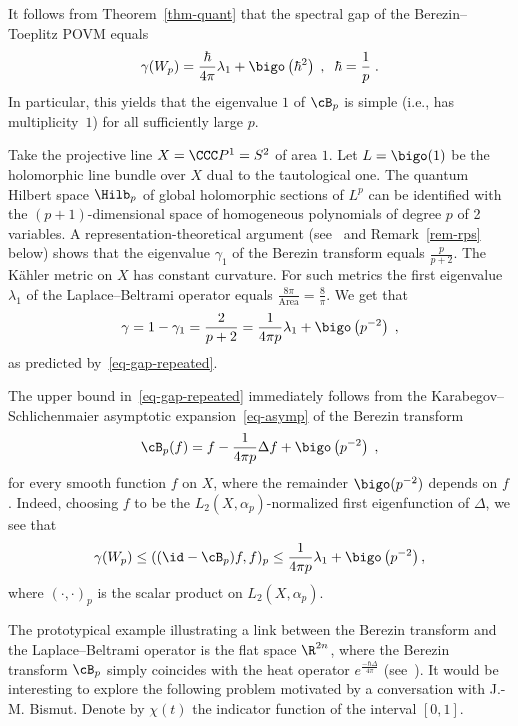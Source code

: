 It follows from Theorem~\ref{thm-quant} that the spectral gap of the Berezin--Toeplitz POVM equals
\begin{equation}\label{eq-gap-repeated}
\gamma(W_p)= \frac{\hbar}{4\pi}\lambda_1 + \bigo\left(\hbar^2\right)\;, \;\; \hbar = \frac{1}{p}\;.
\end{equation}
In particular, this yields that the eigenvalue $1$ of $\cB_p$ is simple (i.e., has multiplicity~$1$) for all sufficiently large $p$.

\begin{exam}\label{exam-CP1}
Take the projective line $X=\CCC P^1=S^2$ of area $1$.
Let $L= \bigo(1)$ be the holomorphic line bundle over $X$ dual to the tautological one. The quantum Hilbert space $\Hilb_p$ of global holomorphic sections of $L^p$ can be identified with the $(p+1)$-dimensional space of homogeneous polynomials of degree $p$ of 2 variables. A representation-theoretical argument (see~\cite {gap-representations, D} and Remark~\ref{rem-rps} below) shows that the eigenvalue $\gamma_1$ of the Berezin transform equals $\frac{p}{p+2}$. The K\"ahler metric on $X$ has constant curvature. For such metrics the first eigenvalue $\lambda_1$ of the Laplace--Beltrami operator equals $\frac{8\pi}{\text{Area}} = \frac{8}{\pi}$. We get that
\[
\gamma = 1-\gamma_1 = \frac{2}{p+2} = \frac{1}{4\pi p}\lambda_1 + \bigo\left(p^{-2}\right)\;,
\]
as predicted by~\eqref{eq-gap-repeated}.
\end{exam}

The upper bound in~\eqref{eq-gap-repeated} immediately follows from the Karabegov--Schlichen\-maier asymptotic expansion~\eqref{eq-asymp} of the Berezin transform~\cite{KS01}
\[
\cB_p(f)= f- \frac{1}{4\pi p}\Delta f + \bigo\left(p^{-2} \right)\;,
\]
for every smooth function $f$ on $X$, where the remainder $\bigo(p^{-2})$ depends on $f$. Indeed, choosing $f$ to be the $L_2(X,\alpha_p)$-normalized first eigenfunction of $\Delta$, we see that
\[
\gamma(W_p) \leq ((\id-\cB_p)f,f)_p \leq \frac{1}{4\pi p}\lambda_1 + \bigo\left(p^{-2}\right),
\]
where $(\cdot,\cdot)_p$ is the scalar product on $L_2(X,\alpha_p)$.

The prototypical example illustrating a link between the Berezin transform and the Laplace--Beltrami operator is the flat space $\R^{2n}$, where the Berezin transform $\cB_p$ simply coincides with the heat operator $e^{\frac{-\hbar \Delta}{4\pi}}$ (see~\cite{B}). It would be interesting to explore the following problem motivated by a conversation with J.-M. Bismut. Denote by $\chi(t)$ the indicator function of the interval $[0,1]$.
%

